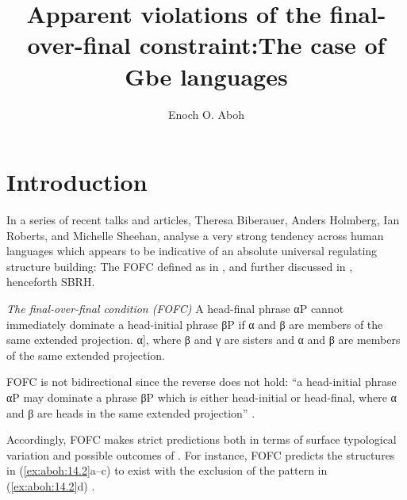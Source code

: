 \documentclass[output=paper]{langsci/langscibook}
\author{Enoch O. Aboh\affiliation{University of Amsterdam}}
\title[Apparent violations of the final-over-final constraint]
      {Apparent violations of the final-over-final constraint:\newlineCover The case of Gbe languages}
      [Apparent violations of the final-over-final constraint: The case of Gbe languages]
\begin{document}
\glsresetall

\section{Introduction}

In a series of recent talks and articles, Theresa Biberauer, Anders Holmberg,
Ian Roberts, and Michelle Sheehan, analyse a very strong tendency across human
languages which appears to be indicative of an absolute universal regulating
structure building: The \gls{FOFC} defined as in , and further
discussed in \textcite{SheeBibRobHol2017}, henceforth
SBRH.

\ea\label{ex:aboh:14.1} \emph{The final-over-final condition (FOFC)}
    \ea A head-final phrase αP cannot immediately dominate a head-initial
    phrase βP if α and β are members of the same extended projection.
    \ex *[\textsubscript{αP} [\textsubscript{βP} β γ] α], where β and  γ are
    sisters and α and β are members of the same extended projection.
    \z
\z

FOFC is not bidirectional since the reverse does not hold: “a head-initial
phrase αP may dominate a phrase βP which is either head-initial or head-final,
where α and β are heads in the same extended projection”
\parencite[cf.][171]{BibHolRob2014}.

Accordingly, \gls{FOFC} makes strict predictions both in terms of surface typological
variation and possible outcomes of 
\parencite[cf.][]{BibNewShee2009}. For instance, \gls{FOFC} predicts the structures
in (\ref{ex:aboh:14.2}a--c) to exist with the exclusion of the pattern in (\ref{ex:aboh:14.2}d)
\parencite[cf.][171]{BibHolRob2014}.
\end{document}
